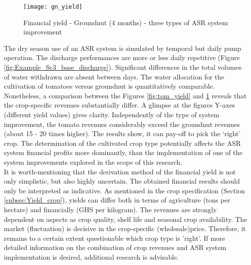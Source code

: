 \begin{figure}[H]
 \centering
 \texttt{[image: gn\_yield]}
 \captionsetup{justification=centering} 
 \caption{Financial yield - Groundnut (4 months) - three types of ASR system improvement}
 \label{fig:gn_yield}
\end{figure}

The dry season use of an ASR system is simulated by temporal but daily pump operation. The discharge performances are more or less daily repetitive (Figure \ref{fig:Example_Sc3_base_discharge}). Significant differences in the total volumes of water withdrawn are absent between days. The water allocation for the cultivation of tomatoes versus groundnut is quantitatively comparable. Nonetheless, a comparison between the Figures \ref{fig:tom_yield} and \ref{fig:gn_yield} reveals that the crop-specific revenues substantially differ. A glimpse at the figures Y-axes (different yield values) gives clarity. Independently of the type of system improvement, the tomato revenues considerably exceed the groundnut revenues (about 15 - 20 times higher). The results show, it can pay-off to pick the ‘right’ crop. The determination of the cultivated crop type potentially affects the ASR system financial profits more dominantly, than the implementation of one of the system improvements explored in the scope of this research. \\



It is worth-mentioning that the derivation method of the financial yield is not only simplistic, but also highly uncertain. The obtained financial results should only be interpreted as indicative. As mentioned in the crop specification (Section \ref{subsec:Yield_crop}), yields can differ both in terms of agriculture (tons per hectare) and financially (GHS per kilogram). The revenues are strongly dependent on aspects as crop quality, shelf life and seasonal crop availability. The market (fluctuation) is decisive in the crop-specific (wholesale)price. Therefore, it remains to a certain extent questionable which crop type is 'right'. If more detailed information on the combination of crop revenues and ASR system implementation is desired, additional research is advisable. \\


